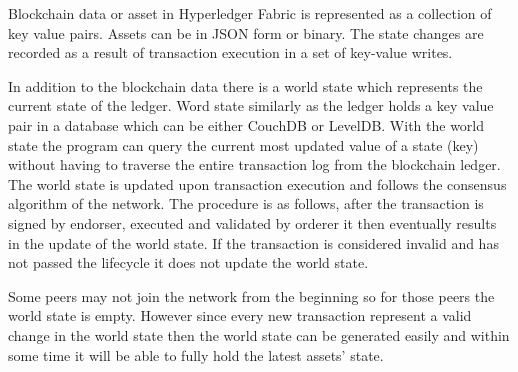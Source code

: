 Blockchain data or asset in Hyperledger Fabric is represented as a collection of key value pairs. Assets can be in JSON form or binary. The state changes are recorded as a result of transaction execution in a set of key-value writes. 


In addition to the blockchain data there is a world state which represents the current state of the ledger. Word state similarly as the ledger holds a key value pair in a database which can be either CouchDB or LevelDB. With the world state the program can query the current most updated value of a state (key) without having to traverse the entire transaction log from the blockchain ledger. The world state is updated upon transaction execution and follows the consensus algorithm of the network. The procedure is as follows, after the transaction is signed by endorser, executed and validated by orderer it then eventually results in the update of the world state. If the transaction is considered invalid and has not passed the lifecycle it does not update the world state. 

Some peers may not join the network from the beginning so for those peers the world state is empty. However since every new transaction represent a valid change in the world state then the world state can be generated easily and within some time it will be able to fully hold the latest assets' state.  